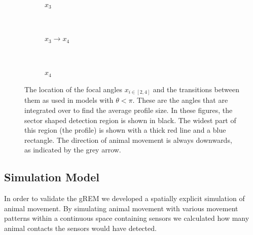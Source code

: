 \documentclass[a4paper,10pt,reqno,oneside]{amsart}
\begin{document}
\begin{figure}[t]
	\begin{subfigure}[t]{0.22\textwidth}
                \centering
                \caption{$x_3$}
                \label{f:x4}
        \end{subfigure}%
	~
	\begin{subfigure}[t]{0.22\textwidth}
                \centering
                \caption{$x_3 \rightarrow x_4$}
                \label{f:x5}
        \end{subfigure}%
	~ 
	\begin{subfigure}[t]{0.22\textwidth}
                \centering
                \caption{$x_4$}
                \label{f:x6}
        \end{subfigure}%
\caption{The location of the focal angles $x_{i\in[2,4]}$ and the transitions between them as used in models with $\theta<\pi$. These are the angles that are integrated over to find the average profile size. In these figures, the sector shaped detection region is shown in black. The widest part of this region (the profile) is shown with a thick red line and a blue rectangle. The direction of animal movement is always downwards, as indicated by the grey arrow. 
     }
\label{f:xis}
\end{figure}


\subsection{Simulation Model}

In order to validate the gREM we developed a spatially explicit simulation of animal movement. By simulating animal movement with various movement patterns within a continuous space containing sensors we calculated how many animal contacts the sensors would have detected. 
\end{document}
